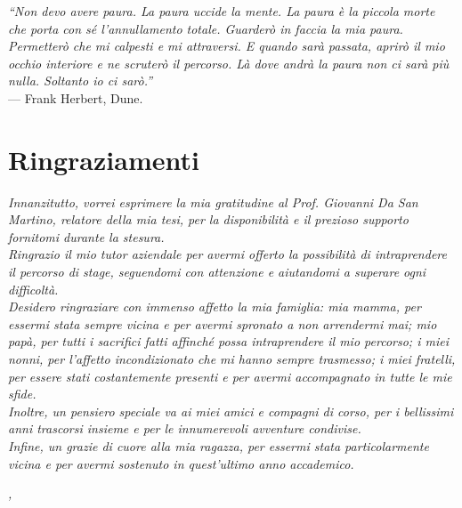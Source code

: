 \clearpage
{}
{}
\bigskip

\begin{flushright}{
    \slshape 
    ``Non devo avere paura. La paura uccide la mente. La paura è la piccola morte che porta con sé l'annullamento totale. Guarderò in faccia la mia paura. Permetterò che mi calpesti e mi attraversi. E quando sarà passata, aprirò il mio occhio interiore e ne scruterò il percorso. Là dove andrà la paura non ci sarà più nulla. Soltanto io ci sarò.''} \\
    \medskip
    --- Frank Herbert, Dune.
\end{flushright}

\begingroup
\let\clearpage\relax
\let\cleardoublepage\relax
\let\cleardoublepage\relax

\chapter*{Ringraziamenti}

\noindent \textit{Innanzitutto, vorrei esprimere la mia gratitudine al Prof. Giovanni Da San Martino, relatore della mia tesi, per la disponibilità e il prezioso supporto fornitomi durante la stesura.}\\

\noindent \textit{Ringrazio il mio tutor aziendale per avermi offerto la possibilità di intraprendere il percorso di stage, seguendomi con attenzione e aiutandomi a superare ogni difficoltà.}\\

\noindent \textit{Desidero ringraziare con immenso affetto la mia famiglia: mia mamma, per essermi stata sempre vicina e per avermi spronato a non arrendermi mai; mio papà, per tutti i sacrifici fatti affinché possa intraprendere il mio percorso; i miei nonni, per l'affetto incondizionato che mi hanno sempre trasmesso; i miei fratelli, per essere stati costantemente presenti e per avermi accompagnato in tutte le mie sfide.}\\

\noindent \textit{Inoltre, un pensiero speciale va ai miei amici e compagni di corso, per i bellissimi anni trascorsi insieme e per le innumerevoli avventure condivise.}\\

\noindent \textit{Infine, un grazie di cuore alla mia ragazza, per essermi stata particolarmente vicina e per avermi sostenuto in quest'ultimo anno accademico.}
\bigskip

\noindent\textit{\myLocation, \myTime}
\hfill \myName

\endgroup

\clearpage
